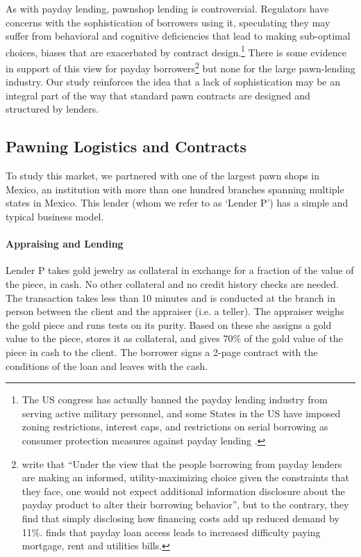 \documentclass[12pt, a4paper]{article}
\begin{document}
As with payday lending, pawnshop lending is controversial. Regulators have concerns with the sophistication of borrowers using it, speculating they may suffer from behavioral and cognitive deficiencies that lead to making sub-optimal choices, biases that are exacerbated by contract design.\footnote{The US congress has actually banned the payday lending industry from serving active military personnel, and some States in the US have imposed zoning restrictions, interest caps, and restrictions on serial borrowing as consumer protection measures against payday lending \citep{Payday}.} There is some evidence in support of this view for payday borrowers\footnote{\cite{Bertrand} write that ``Under the view that the people borrowing from payday lenders are making an informed, utility-maximizing choice given the constraints that they face, one would not expect additional information disclosure about the payday product to alter their borrowing behavior'', but to the contrary, they find that simply disclosing how financing costs add up reduced demand by 11\%. \cite{Meltzer} finds that payday loan access leads to increased difficulty paying mortgage, rent and utilities bills.} but none for the large pawn-lending industry. Our study reinforces the idea that a lack of sophistication may be an integral part of the way that standard pawn contracts are designed and structured by lenders.



\subsection{Pawning Logistics and Contracts}

To study this market, we partnered with one of the largest pawn shops in Mexico, an institution with more than one hundred branches spanning multiple states in Mexico. This lender (whom we refer to as `Lender P') has a simple and typical business model. 

\paragraph*{Appraising and Lending} Lender P takes gold jewelry as collateral in exchange for a fraction of the value of the piece, in cash. No other collateral and no credit history checks are needed. The transaction takes less than 10 minutes and is conducted at the branch in person between the client and the appraiser (i.e. a teller).
The appraiser weighs the gold piece and runs tests on its purity. Based on these she assigns a gold value to the piece, stores it as collateral, and gives 70\% of the gold value of the piece in cash to the client. The borrower signs a 2-page contract with the conditions of the loan and leaves with the cash.
\end{document}
